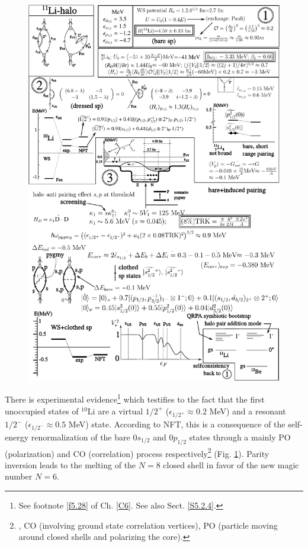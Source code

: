      \begin{figure}
     \centerline {
     \includegraphics*[width=16cm]{introduccion/figs/fig1_9_1}
     }
     \caption{}
     \label{fig1.9.1}
     \end{figure}
 

 
There is  experimental evidence\footnote{See footnote \ref{f5.28} of Ch. \ref{C6}. See also Sect. \ref{S5.2.4}.} which testifies to the fact that the first unoccupied states of $^{10}$Li are a virtual $1/2^+$ ($\epsilon_{1/2^+}\approx0.2$ MeV) and a resonant $1/2^-$ ($\epsilon_{1/2^-}\approx0.5$ MeV) state.   According to NFT, this is a consequence of the self-energy renormalization of the bare $0s_{1/2}$ and $0p_{1/2}$ states through a mainly PO (polarization) and CO (correlation) process respectively\footnote{\cite{Barranco:01,Barranco:20}, CO (involving ground state correlation vertices), PO (particle moving around closed shells and polarizing the core).} (Fig. \ref{fig1.9.1}).  Parity inversion leads to the melting of  the $N=8$ closed shell in favor of the new magic number $N=6$. 




